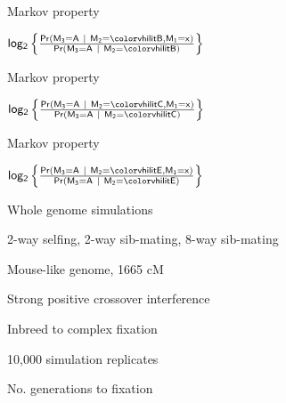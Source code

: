 \documentclass[aspectratio=169,12pt,t]{beamer}
\begin{document}
\begin{frame}[c]{Markov property}

\centerline{\hspace*{15mm} \hilit
$ \mathsf{log_2 \left\{ \frac{
    Pr(M_3 = A \ | \ M_2 = {\vhilit B}, M_1 = x)}{
    Pr(M_3 = A \ | \ M_2 = {\vhilit B})}\right\}}$
}

\end{frame}



\begin{frame}[c]{Markov property}

\centerline{\hspace*{15mm} \hilit
$ \mathsf{log_2 \left\{ \frac{
    Pr(M_3 = A \ | \ M_2 = {\vhilit C}, M_1 = x)}{
    Pr(M_3 = A \ | \ M_2 = {\vhilit C})}\right\}}$
}

\end{frame}


\begin{frame}[c]{Markov property}

\centerline{\hspace*{15mm} \hilit
$ \mathsf{log_2 \left\{ \frac{
    Pr(M_3 = A \ | \ M_2 = {\vhilit E}, M_1 = x)}{
    Pr(M_3 = A \ | \ M_2 = {\vhilit E})}\right\}}$
}

\end{frame}



\begin{frame}[c]{Whole genome simulations}

\bbi
\item 2-way selfing, 2-way sib-mating, 8-way sib-mating

\item Mouse-like genome, 1665 cM

\item Strong positive crossover interference

\item Inbreed to complex fixation

\item 10,000 simulation replicates
\ei

  \end{frame}


\begin{frame}[c]{No. generations to fixation}
\end{frame}
\end{document}
